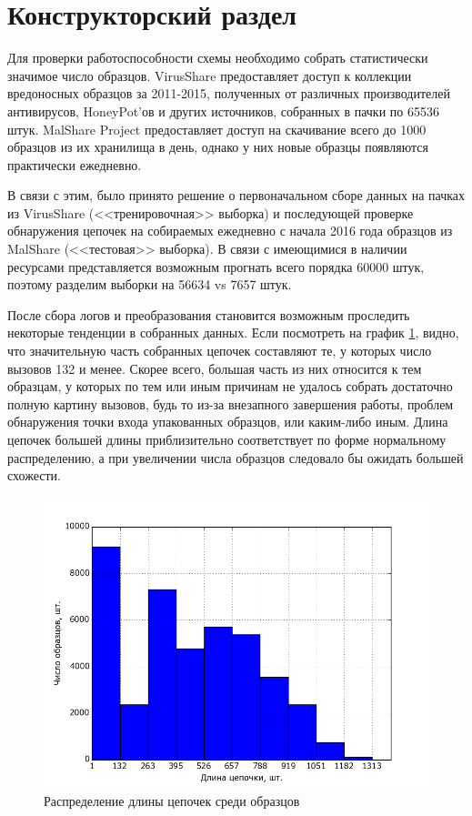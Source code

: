 \section {Конструкторский раздел}
Для проверки работоспособности схемы необходимо собрать статистически значимое число образцов. 
VirusShare \cite{VIRUSSHARE} предоставляет доступ к коллекции вредоносных образцов за 2011-2015, полученных от различных производителей антивирусов, HoneyPot'ов и других источников, собранных в пачки по 65536 штук.
MalShare Project \cite{MALSHARE} предоставляет доступ на скачивание  всего до 1000 образцов из их хранилища в день, однако у них новые образцы появляются практически ежедневно.

В связи с этим, было принято решение о первоначальном сборе данных на пачках из VirusShare (<<тренировочная>> выборка) и последующей проверке обнаружения цепочек на собираемых ежедневно с начала 2016 года образцов из MalShare (<<тестовая>> выборка). В связи с имеющимися в наличии ресурсами представляется возможным прогнать всего порядка 60000 штук, поэтому разделим выборки на 56634 vs 7657 штук.

После сбора логов и преобразования становится возможным проследить некоторые тенденции в собранных данных. Если посмотреть на график \ref{fig:seq_len_hist}, видно, что значительную часть собранных цепочек составляют те, у которых число вызовов 132 и менее. Скорее всего, большая часть из них относится к тем образцам, у которых по тем или иным причинам не удалось собрать достаточно полную картину вызовов, будь то из-за внезапного завершения работы, проблем обнаружения точки входа упакованных образцов, или каким-либо иным. Длина цепочек большей длины приблизительно соответствует по форме нормальному распределению, а при увеличении числа образцов следовало бы ожидать большей схожести.

\begin {figure}[ht]
        \centering
        \includegraphics[width=\linewidth] {img/sequence_len_hist.png}
        \caption {Распределение длины цепочек среди образцов}
        \label {fig:seq_len_hist}
\end {figure}

